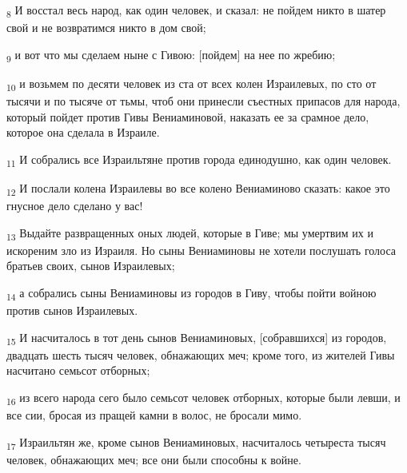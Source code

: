 \begin{tcolorbox}
\textsubscript{8} И восстал весь народ, как один человек, и сказал: не пойдем никто в шатер свой и не возвратимся никто в дом свой;
\end{tcolorbox}
\begin{tcolorbox}
\textsubscript{9} и вот что мы сделаем ныне с Гивою: [пойдем] на нее по жребию;
\end{tcolorbox}
\begin{tcolorbox}
\textsubscript{10} и возьмем по десяти человек из ста от всех колен Израилевых, по сто от тысячи и по тысяче от тьмы, чтоб они принесли съестных припасов для народа, который пойдет против Гивы Вениаминовой, наказать ее за срамное дело, которое она сделала в Израиле.
\end{tcolorbox}
\begin{tcolorbox}
\textsubscript{11} И собрались все Израильтяне против города единодушно, как один человек.
\end{tcolorbox}
\begin{tcolorbox}
\textsubscript{12} И послали колена Израилевы во все колено Вениаминово сказать: какое это гнусное дело сделано у вас!
\end{tcolorbox}
\begin{tcolorbox}
\textsubscript{13} Выдайте развращенных оных людей, которые в Гиве; мы умертвим их и искореним зло из Израиля. Но сыны Вениаминовы не хотели послушать голоса братьев своих, сынов Израилевых;
\end{tcolorbox}
\begin{tcolorbox}
\textsubscript{14} а собрались сыны Вениаминовы из городов в Гиву, чтобы пойти войною против сынов Израилевых.
\end{tcolorbox}
\begin{tcolorbox}
\textsubscript{15} И насчиталось в тот день сынов Вениаминовых, [собравшихся] из городов, двадцать шесть тысяч человек, обнажающих меч; кроме того, из жителей Гивы насчитано семьсот отборных;
\end{tcolorbox}
\begin{tcolorbox}
\textsubscript{16} из всего народа сего было семьсот человек отборных, которые были левши, и все сии, бросая из пращей камни в волос, не бросали мимо.
\end{tcolorbox}
\begin{tcolorbox}
\textsubscript{17} Израильтян же, кроме сынов Вениаминовых, насчиталось четыреста тысяч человек, обнажающих меч; все они были способны к войне.
\end{tcolorbox}
